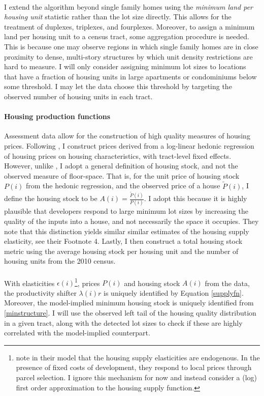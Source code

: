 \documentclass[]{article}
\begin{document}
\paragraph*{}
I extend the algorithm beyond single family homes using the \textit{minimum land per housing unit} statistic rather than the lot size directly. This allows for the treatment of duplexes, triplexes, and fourplexes. Moreover, to assign a minimum land per housing unit to a census tract, some aggregation procedure is needed. This is because one may observe regions in which single family homes are in close proximity to dense, multi-story structures by which unit density restrictions are hard to measure. I will only consider assigning minimum lot sizes to locations that have a fraction of housing units in large apartments or condominiums below some threshold. I may let the data choose this threshold by targeting the observed number of housing units in each tract. 


\paragraph*{Housing production functions} Assessment data allow for the construction of high quality measures of housing prices. Following \cite{BSH}, I construct prices derived from a log-linear hedonic regression of housing prices on housing characteristics, with tract-level fixed effects. However, unlike \cite{BSH}, I adopt a general definition of housing stock, and not the observed measure of floor-space. That is, for the unit price of housing stock $P(i)$ from the hedonic regression, and the observed price of a house $\tilde{P}(i)$, I define the housing stock to be $A(i) = \frac{\tilde{P}(i)}{P(i)}$. I adopt this because it is highly plausible that developers respond to large minimum lot sizes by increasing the quality of the inputs into a house, and not necessarily the space it occupies. They note that this distinction yields similar similar estimates of the housing supply elasticity, see their Footnote 4. Lastly, I then construct a total housing stock metric using the average housing stock per housing unit and the number of housing units from the 2010 census. 
\paragraph*{}
With elasticities $\epsilon(i)$\footnote{\cite{BSH} note in their model that the housing supply elasticities are endogenous. In the presence of fixed costs of development, they respond to local prices through parcel selection. I ignore this mechanism for now and instead consider a (log) first order approximation to the housing supply function.}, prices $P(i)$ and housing stock $A(i)$ from the data, the productivity shifter $\lambda(i)r$ is uniquely identified by Equation \eqref{supplyfn}. Moreover, the model-implied minimum housing stock is uniquely identified from \eqref{minstructure}. I will use the observed left tail of the housing quality distribution in a given tract, along with the detected lot sizes to check if these are highly correlated with the model-implied counterpart. 
\end{document}

